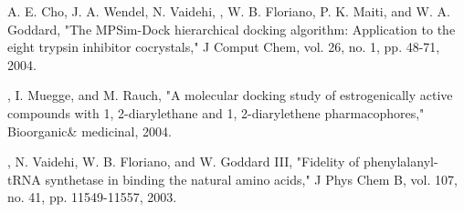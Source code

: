 \begin{etaremune}
\item A. E. Cho, J. A. Wendel, N. Vaidehi, \pmkh, W. B. Floriano, P. K. Maiti, and W. A. Goddard, "The MPSim-Dock hierarchical docking algorithm: Application to the eight trypsin inhibitor cocrystals," J Comput Chem, vol. 26, no. 1, pp. 48-71, 2004.
\item \pmkh, I. Muegge, and M. Rauch, "A molecular docking study of estrogenically active compounds with 1, 2-diarylethane and 1, 2-diarylethene pharmacophores," Bioorganic\& medicinal, 2004.
\item \pmkh, N. Vaidehi, W. B. Floriano, and W. Goddard III, "Fidelity of phenylalanyl-tRNA synthetase in binding the natural amino acids," J Phys Chem B, vol. 107, no. 41, pp. 11549-11557, 2003. %

\end{etaremune}
